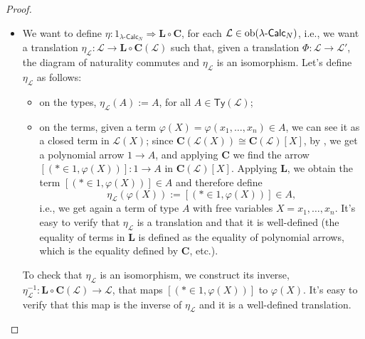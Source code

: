 \begin{proof}
\begin{itemize}
        By Lambek's normal form, we know $\Hom_{\mathcal C[y]}(1,C) \cong \Hom_\mathcal C(B,C)$,
        but $\Hom_{\mathbf C \circ \mathbf L(\mathcal C)}(B,C) \cong \Hom_{\mathcal C[y]}(1,C)$, by definition, since we take the equivalence classes of terms $\varphi(y) \in C$ that are said to be equal if they are equal in $\mathcal C[y]$.
        Therefore, $\varepsilon_\mathcal C$ is an isomorphism in $\mathsf{CCC}_N$; hence, $\varepsilon$ is a natural isomorphism.
        \item[$\boxed{1_{\lambda\text{-}\mathsf{Calc}_N} \Rightarrow \mathbf L \circ \mathbf C}$] We want to define $\eta : 1_{\lambda\text{-}\mathsf{Calc}_N} \Rightarrow \mathbf L \circ \mathbf C$, for each $\mathcal L \in \operatorname{ob}(\lambda\text{-}\mathsf{Calc}_N)$, i.e.,
        we want a translation $\eta_\mathcal L : \mathcal L \to \mathbf L \circ \mathbf C(\mathcal L)$ such that, given a translation $\Phi : \mathcal L \to \mathcal L'$, the diagram of naturality commutes and $\eta_{\mathcal L}$ is an isomorphism.\newline
        Let's define $\eta_\mathcal L$ as follows:
        \begin{itemize}
            \item on the types, $\eta_\mathcal L(A) := A$, for all $A \in \mathsf{Ty}(\mathcal L)$;
            \item on the terms, given a term $\varphi(X) = \varphi(x_1,\dots,x_n) \in A$, we can see it as a closed term in $\mathcal L(X)$;
            since $\mathbf C(\mathcal L(X)) \cong \mathbf C(\mathcal L)[X]$, by , we get a polynomial arrow $1 \to A$, and applying $\mathbf C$ we find the arrow $[(* \in 1, \varphi(X))] : 1 \to A$ in $\mathbf C(\mathcal L)[X]$.
            Applying $\mathbf L$, we obtain the term $[(* \in 1, \varphi(X))] \in A$ and therefore define
            \[ \eta_\mathcal L(\varphi(X)) := [(* \in 1, \varphi(X))] \in A, \]
            i.e., we get again a term of type $A$ with free variables $X = x_1,\dots,x_n$. It's easy to verify that $\eta_\mathcal L$ is a translation and that it is well-defined (the equality of terms in $\mathbf L$ is defined as the equality of polynomial arrows, which is the equality defined by $\mathbf C$, etc.).
        \end{itemize}
        To check that $\eta_\mathcal L$ is an isomorphism, we construct its inverse, $\eta_\mathcal L^{-1} : \mathbf L \circ \mathbf C(\mathcal L) \to \mathcal L$, that maps $[(* \in 1, \varphi(X))]$ to $\varphi(X)$. It's easy to verify that this map is the inverse of $\eta_\mathcal L$ and it is a well-defined translation.\newline

\end{itemize}
\end{proof}
